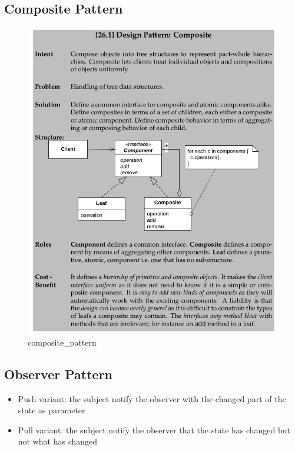 \documentclass[11pt]{article}
\makeatletter
\def\maxwidth{\ifdim\Gin@nat@width>\linewidth\linewidth
    \else\Gin@nat@width\fi}
\let\Oldincludegraphics\includegraphics
\renewcommand{\includegraphics}[1]{\Oldincludegraphics[width=.8\maxwidth]{#1}}
\providecommand{\tightlist}{%
      \setlength{\itemsep}{0pt}\setlength{\parskip}{0pt}}
\makeatother
\begin{document}
\hypertarget{composite-pattern}{%
\subsection{Composite Pattern}\label{composite-pattern}}

\begin{figure}
\centering
\includegraphics{img/composite_pattern.png}
\caption{composite\_pattern}
\end{figure}

\hypertarget{observer-pattern}{%
\subsection{Observer Pattern}\label{observer-pattern}}

\begin{itemize}
\tightlist
\item
  Push variant: the subject notify the observer with the changed part of
  the state as parameter
\item
  Pull variant: the subject notify the observer that the state has
  changed but not what has changed
\end{itemize}
\end{document}

